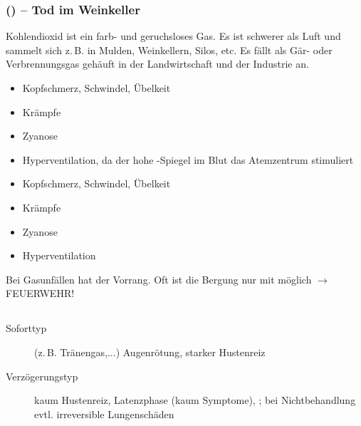 \subsubsection{ 
(\texorpdfstring{}{CO2}) -- Tod im Weinkeller}

\Text
{{\TxBeschreibung}}%
{%
Kohlendioxid ist ein farb- und geruchsloses Gas. Es ist
schwerer als Luft und sammelt sich z.\,B. in Mulden,
Weinkellern, Silos, etc. Es fällt als Gär- oder
Verbrennungsgas gehäuft in der Landwirtschaft und der
Industrie an.
}%



\TextSlide{\TxSymptome}
{%
\begin{itemize}
  \item Kopfschmerz, Schwindel, Übelkeit
  \item Krämpfe
  \item Zyanose
  \item Hyperventilation, da der hohe
  -Spiegel im Blut das Atemzentrum stimuliert
\end{itemize}
}{
\begin{itemize}
  \item Kopfschmerz, Schwindel, Übelkeit
  \item Krämpfe
  \item Zyanose
  \item Hyperventilation
\end{itemize}
}{}{}{}



\begin{Danger}
  \item Bei Gasunfällen hat der  Vorrang.
  Oft ist die Bergung nur mit  möglich ${\rightarrow}$ FEUERWEHR!
\end{Danger}

\begin{Synopsis}
\end{Synopsis}

\subsection{}

{%
\begin{description}
  \item[Soforttyp] (z.\,B. Tränengas,...) Augenrötung, starker Hustenreiz
  \item[Verzögerungstyp]  kaum
  Hustenreiz, Latenzphase (kaum Symptome),
  ;
  bei Nichtbehandlung evtl. irreversible Lungenschäden
\end{description}
}{

}{}{}{}


